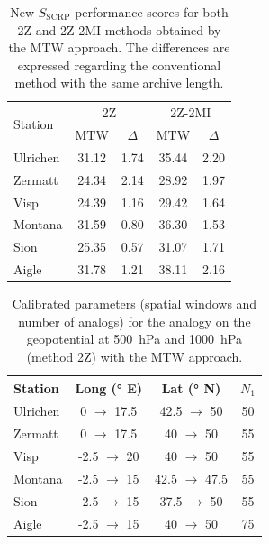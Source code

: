\documentclass[hess, manuscript]{copernicus}
\begin{document}
\begin{table}[htb]
	\caption{New $S_{\text{SCRP}}$ performance scores for both 2Z and 2Z-2MI methods obtained by the MTW approach. The differences are expressed regarding the conventional method with the same archive length.}
	\begin{center}
		\begin{tabular}{l c c c c}
			\hline
			\multirow{2}{*}{Station} & \multicolumn{2}{c}{2Z} & \multicolumn{ 2}{c}{2Z-2MI} \\
			& MTW & $\Delta$ & MTW & $\Delta$ \\
			\hline
			Ulrichen & 31.12 & 1.74 & 35.44 & 2.20 \\
			Zermatt & 24.34 & 2.14 & 28.92 & 1.97 \\
			Visp & 24.39 & 1.16 & 29.42 & 1.64 \\
			Montana & 31.59 & 0.80 & 36.30 & 1.53 \\
			Sion & 25.35 & 0.57 & 31.07 & 1.71 \\
			Aigle & 31.78 & 1.21 & 38.11 & 2.16 \\ 
			\hline
		\end{tabular}
	\end{center}
	\label{table:CRPSS_MTW}
\end{table}

\begin{table}[htb]
	\caption{Calibrated parameters (spatial windows and number of analogs) for the analogy on the geopotential at 500~hPa and 1000~hPa (method 2Z) with the MTW approach.}
	\begin{center}
		\begin{tabular}{l c c c }
			\hline
			Station & Long (° E) & Lat (° N) & $N_{1}$ \\
			\hline
			Ulrichen & 0 $\rightarrow$ 17.5 & 42.5 $\rightarrow$ 50 & 50 \\
			Zermatt & 0 $\rightarrow$ 17.5 & 40 $\rightarrow$ 50 & 55 \\
			Visp & -2.5 $\rightarrow$ 20 & 40 $\rightarrow$ 50 & 55 \\
			Montana & -2.5 $\rightarrow$ 15 & 42.5 $\rightarrow$ 47.5 & 55 \\
			Sion & -2.5 $\rightarrow$ 15 & 37.5 $\rightarrow$ 50 & 55 \\
			Aigle & -2.5 $\rightarrow$ 15 & 40 $\rightarrow$ 50 & 75 \\
			\hline
		\end{tabular}
	\end{center}
	\label{table:params_2Z_new}
\end{table}
\end{document}
